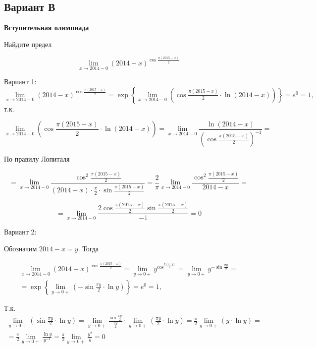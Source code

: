 \documentclass[addpoints, answers]{exam} %
\begin{document}
\subsection{Вариант В}
\textbf{Вступительная олимпиада}

\begin{questions}



\question[10] Найдите предел

\[
\lim_{x\to 2014-0} (2014-x)^{\cos \frac{\pi (2015-x)}{2} } 
\]

\begin{solution}
Вариант 1:
$\mathop{\lim }\limits_{x\to 2014-0} (2014-x)^{\cos \frac{\pi (2015-x)}{2} } =\exp \left\{\mathop{\lim }\limits_{x\to 2014-0} \left(\cos \frac{\pi (2015-x)}{2} \cdot \ln (2014-x)\right)\right\}=e^{0} =1,$ т.к.

\[\mathop{\lim }\limits_{x\to 2014-0} \left(\cos \frac{\pi (2015-x)}{2} \cdot \ln (2014-x)\right)=\mathop{\lim }\limits_{x\to 2014-0} \frac{\ln (2014-x)}{\left(\cos \frac{\pi (2015-x)}{2} \right)^{-1} } =\] 

По правилу Лопиталя

\[=\mathop{\lim }\limits_{x\to 2014-0} \frac{\cos ^{2} \frac{\pi (2015-x)}{2} }{(2014-x)\cdot \frac{\pi }{2} \cdot \sin \frac{\pi (2015-x)}{2} } =\frac{2}{\pi } \mathop{\lim }\limits_{x\to 2014-0} \frac{\cos ^{2} \frac{\pi (2015-x)}{2} }{2014-x} =\] 

\[=\mathop{\lim }\limits_{x\to 2014-0} \frac{2\cos \frac{\pi (2015-x)}{2} \sin \frac{\pi (2015-x)}{2} }{-1} =0\] 


Вариант 2:

Обозначим $2014-x=y$. Тогда 

\[\begin{array}{l} {\mathop{\lim }\limits_{x\to 2014-0} (2014-x)^{\cos \frac{\pi (2015-x)}{2} } =\mathop{\lim }\limits_{y\to 0+} y^{\cos ^{\frac{\pi (1+y)}{2} } } =\mathop{\lim }\limits_{y\to 0+} y^{-\sin \frac{\pi y}{2} } =} \\ {=\exp \left\{\mathop{\lim }\limits_{y\to 0+} \left(-\sin \frac{\pi y}{2} \cdot \ln y\right)\right\}=e^{0} =1,} \end{array}\] 

Т.к. $\begin{array}{l} {\mathop{\lim }\limits_{y\to 0+} \left(\sin \frac{\pi y}{2} \cdot \ln y\right)=\mathop{\lim }\limits_{y\to 0+} \frac{\sin \frac{\pi y}{2} }{\frac{\pi y}{2} } \cdot \mathop{\lim }\limits_{y\to 0+} \left(\frac{\pi y}{2} \cdot \ln y\right)=\frac{\pi }{2} \mathop{\lim }\limits_{y\to 0+} \left(y\cdot \ln y\right)=} \\ {=\frac{\pi }{2} \mathop{\lim }\limits_{y\to 0+} \frac{\ln y}{y^{-1} } =\frac{\pi }{2} \mathop{\lim }\limits_{y\to 0+} \frac{y^{2} }{y} =0} \end{array}$


\end{solution}
\end{questions}
\end{document}
